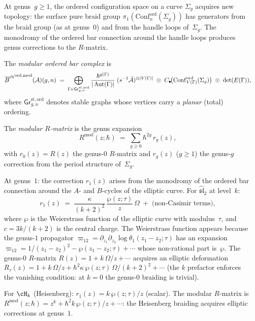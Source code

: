 \begin{construction}
\label{constr:modular-ordered-bar}
At genus~$g\ge 1$, the ordered configuration space on a curve
$\Sigma_g$ acquires new topology: the surface pure braid group
$\pi_1(\mathrm{Conf}_n^{\mathrm{ord}}(\Sigma_g))$ has generators
from the braid group (as at genus~$0$) and from the handle
loops of~$\Sigma_g$. The monodromy of the ordered bar connection
around the handle loops produces genus corrections to the
$R$-matrix.

The \emph{modular ordered bar complex} is
\[
{\overline{B}^{\mathrm{ch}}}^{\mathrm{ord,mod}}(\mathcal{A})(g,n)
\;=\;
\bigoplus_{\Gamma\in\mathsf{Gr}^{\mathrm{st,ord}}_{g,n}}
\frac{\hbar^{g(\Gamma)}}{|\operatorname{Aut}(\Gamma)|}
\;(s^{-1}\bar{\mathcal{A}})^{\otimes|V(\Gamma)|}
\;\otimes\;
C_\bullet\!\bigl(
\mathrm{Conf}^{\mathrm{ord}}_{V(\Gamma)}(\Sigma_g)\bigr)
\;\otimes\;\det(E(\Gamma)),
\]
where $\mathsf{Gr}^{\mathrm{st,ord}}_{g,n}$ denotes stable
graphs whose vertices carry a \emph{planar} (total) ordering.

The \emph{modular $R$-matrix} is the genus expansion
\begin{equation}\label{eq:modular-r-matrix}
R^{\mathrm{mod}}(z;\hbar)
\;=\;
\sum_{g\ge 0}\hbar^{2g}\,r_g(z),
\end{equation}
with $r_0(z)=R(z)$ the genus-$0$ $R$-matrix and $r_g(z)$
($g\ge 1$) the genus-$g$ correction from the period structure
of~$\Sigma_g$.

At genus~$1$: the correction $r_1(z)$ arises from the monodromy
of the ordered bar connection around the $A$- and $B$-cycles
of the elliptic curve. For
$\widehat{\mathfrak{sl}}_2$ at level~$k$:
\[
r_1(z)
\;=\;
\frac{\kappa}{(k+2)^2}\,
\frac{\wp(z;\tau)}{z}\,\Omega
\;+\;\text{(non-Casimir terms)},
\]
where $\wp$ is the Weierstrass function of the elliptic
curve with modulus~$\tau$, and $c=3k/(k+2)$ is the central charge.
The Weierstrass function appears because the genus-$1$
propagator $\varpi_{12}=\partial_{z_1}\partial_{z_2}\log
\theta_1(z_1-z_2;\tau)$ has an expansion
$\varpi_{12}=1/(z_1-z_2)^2-\wp(z_1-z_2;\tau)+\cdots$
whose non-rational part is~$\wp$. The genus-$0$
$R$-matrix $R(z)=1+k\,\Omega/z+\cdots$ acquires an
elliptic deformation $R_\tau(z)=1+k\,\Omega/z
+\hbar^2\kappa\,\wp(z;\tau)\,\Omega/(k+2)^2+\cdots$
(the $k$ prefactor enforces the vanishing condition: at $k=0$ the
genus-$0$ braiding is trivial).

For $\cH_k$ (Heisenberg): $r_1(z)=k\,\wp(z;\tau)/z$
(scalar). The modular $R$-matrix is
$R^{\mathrm{mod}}(z;\hbar)=z^k+\hbar^2 k\,\wp(z;\tau)/z+\cdots$:
the Heisenberg braiding acquires elliptic corrections at genus~$1$.
\end{construction}

